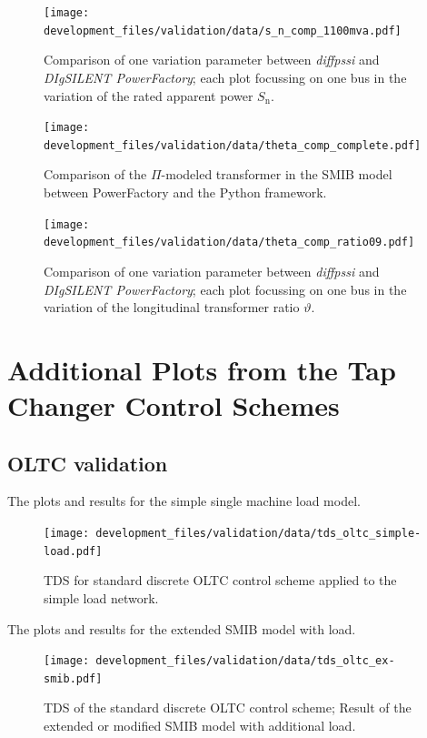 \begin{figure}[H]
    \centering
    \texttt{[image: development\_files/validation/data/s\_n\_comp\_1100mva.pdf]}
    \caption{Comparison of one variation parameter between \textit{diffpssi} and \textit{DIgSILENT PowerFactory}; each plot focussing on one bus in the variation of the rated apparent power $S_\mathrm{n}$.}
    \label{fig:valid-s-1100}
\end{figure}

\begin{figure}[H]
    \centering
    \texttt{[image: development\_files/validation/data/theta\_comp\_complete.pdf]}
    \caption{Comparison of the $\Pi$-modeled transformer in the \acs{SMIB} model between PowerFactory and the Python framework.}
    \label{fig:valid-ratio-comp}
\end{figure}

\begin{figure}[H]
    \centering
    \texttt{[image: development\_files/validation/data/theta\_comp\_ratio09.pdf]}
    \caption{Comparison of one variation parameter between \textit{diffpssi} and \textit{DIgSILENT PowerFactory}; each plot focussing on one bus in the variation of the longitudinal transformer ratio $\vartheta$.}
    \label{fig:valid-ratio-09}
\end{figure}

\section{Additional Plots from the Tap Changer Control Schemes}
\label{app:add-validation-tap-changer}

\subsection{OLTC validation}

The plots and results for the simple single machine load model.

\begin{figure}[H]
    \centering
    \texttt{[image: development\_files/validation/data/tds\_oltc\_simple-load.pdf]}
    \caption{\acf{TDS} for standard discrete \acs{OLTC} control scheme applied to the simple load network.}
    \label{fig:valid-ratio-09}
\end{figure}

The plots and results for the extended \acs{SMIB} model with load.

\begin{figure}[H]
    \centering
    \texttt{[image: development\_files/validation/data/tds\_oltc\_ex-smib.pdf]}
    \caption[Time Domain Result of the OLTC control scheme applied on the extended \acs{SMIB} network]{\acf{TDS} of the standard discrete \acs{OLTC} control scheme; Result of the extended or modified \acs{SMIB} model with additional load.}
    \label{fig:tds-oltc-ex-smib}
\end{figure}

